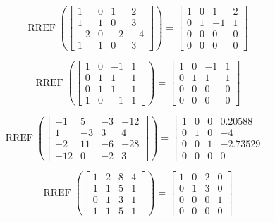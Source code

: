 \documentclass{article}
\DeclareMathOperator{\RREF}{RREF}
\begin{document}
\[
  \RREF\left(\begin{bmatrix}
    1 & 0 & 1 & 2 \\
    1 & 1 & 0 & 3 \\
    -2 & 0 & -2 & -4 \\
    1 & 1 & 0 & 3
  \end{bmatrix} \right) =
  \begin{bmatrix}
    1 & 0 & 1 & 2 \\
    0 & 1 & -1 & 1 \\
    0 & 0 & 0 & 0 \\
    0 & 0 & 0 & 0 
  \end{bmatrix}
\]

\[
  \RREF\left(\begin{bmatrix}
    1 & 0 & -1 & 1 \\
    0 & 1 & 1 & 1 \\
    0 & 1 & 1 & 1 \\
    1 & 0 & -1 & 1
  \end{bmatrix} \right) =
  \begin{bmatrix}
    1 & 0 & -1 & 1 \\
    0 & 1 & 1 & 1 \\
    0 & 0 & 0 & 0 \\
    0 & 0 & 0 & 0 
  \end{bmatrix}
\]


  
\[\RREF \left( 
\begin{bmatrix} 
-1 &5 & -3 & -12 \\ 
1 & -3 & 3 &4 \\ 
-2 & 11 & -6 & -28 \\ 
-12 & 0 & -2 & 3 
\end{bmatrix} \right) = 
\begin{bmatrix} 
1 & 0 & 0 & 0.20588 \\ 
0 & 1 & 0 & -4 \\ 
0 & 0 & 1 & -2.73529 \\ 
0 & 0 & 0 & 0
\end{bmatrix}\]

  
  
\[\RREF \left( 
\begin{bmatrix} 
1 & 2 & 8 & 4 \\ 
1 & 1 & 5 & 1 \\ 
0 & 1 & 3 & 1 \\ 
1 & 1 & 5 & 1 
\end{bmatrix} \right) = 
\begin{bmatrix} 
1 & 0 & 2 & 0 \\ 
0 & 1 & 3 & 0 \\ 
0 & 0 & 0 & 1 \\ 
0 & 0 & 0 & 0
\end{bmatrix}\]
\end{document}
